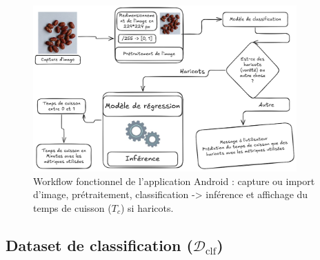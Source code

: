 \begin{figure}[H]
	\centering
	\includegraphics[width=0.9\textwidth]{figures/workflow.png}
	\caption{Workflow fonctionnel de l’application Android : capture ou import d’image, prétraitement, classification -> inférence et affichage du temps de cuisson (\(T_c\)) si haricots.}
	\label{fig:app_workflow}
\end{figure}

\subsection{Dataset de classification (\(\mathcal{D}_{\text{clf}}\))}

